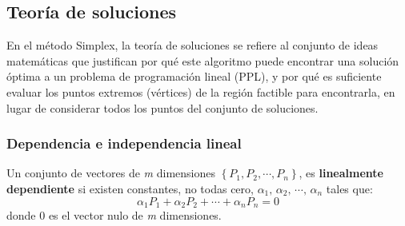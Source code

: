 \subsection{Teoría de soluciones}

En el método Simplex, la teoría de soluciones se refiere al conjunto de ideas matemáticas que justifican por qué este algoritmo puede encontrar una solución óptima a un problema de programación lineal (PPL), y por qué es suficiente evaluar los puntos extremos (vértices) de la región factible para encontrarla, en lugar de considerar todos los puntos del conjunto de soluciones.

\subsubsection{Dependencia e independencia lineal}

Un conjunto de vectores de \textit{m} dimensiones \(\left\{P_1,P_2,\cdots, P_n\right\}\), es \textbf{linealmente dependiente} si existen constantes, no todas cero, \(\alpha_1,\, \alpha_2,\, \cdots,\, \alpha_n\) tales que:
\begin{equation}
  \alpha_1 P_1 + \alpha_2 P_2 + \cdots + \alpha_n P_n = 0
  \label{eq:dependencia_lineal}
\end{equation}
donde \(0\) es el vector nulo de \textit{m} dimensiones.

